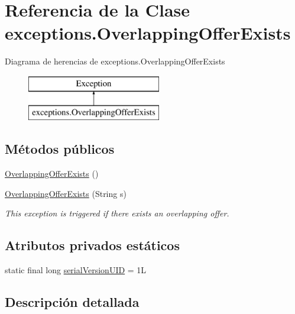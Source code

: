 \hypertarget{classexceptions_1_1_overlapping_offer_exists}{}\section{Referencia de la Clase exceptions.\+Overlapping\+Offer\+Exists}
\label{classexceptions_1_1_overlapping_offer_exists}
Diagrama de herencias de exceptions.\+Overlapping\+Offer\+Exists\begin{figure}[H]
\begin{center}
\leavevmode
\includegraphics[height=2.000000cm]{classexceptions_1_1_overlapping_offer_exists}
\end{center}
\end{figure}
\subsection*{Métodos públicos}
\begin{DoxyCompactItemize}
\item 
\mbox{\hyperlink{classexceptions_1_1_overlapping_offer_exists_a1ba2d73acc9428e642786973e8b2b6b3}{Overlapping\+Offer\+Exists}} ()
\item 
\mbox{\hyperlink{classexceptions_1_1_overlapping_offer_exists_a053baab9b6c9e1da073098c4cfbcdc45}{Overlapping\+Offer\+Exists}} (String s)
\begin{DoxyCompactList}\small\item\em This exception is triggered if there exists an overlapping offer. \end{DoxyCompactList}\end{DoxyCompactItemize}
\subsection*{Atributos privados estáticos}
\begin{DoxyCompactItemize}
\item 
static final long \mbox{\hyperlink{classexceptions_1_1_overlapping_offer_exists_ab47bd08f41ac7a43204806e53aa1538a}{serial\+Version\+U\+ID}} = 1L
\end{DoxyCompactItemize}


\subsection{Descripción detallada}


